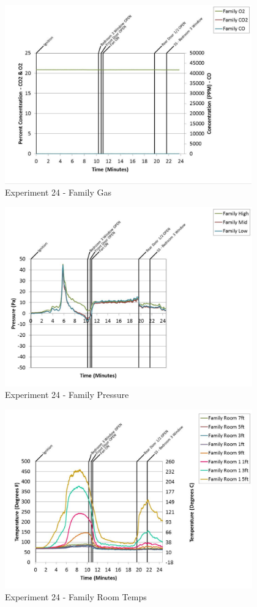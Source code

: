 \documentclass{article}
\begin{document}
\begin{appendices}
	\clearpage

	\begin{figure}[h!]
		\centering
		\includegraphics[height=3.05in]{0_Images/Results_Charts/Exp_24_Charts/FamilyGas.pdf}
		\caption{Experiment 24 - Family Gas}
	\end{figure}
 

	\begin{figure}[h!]
		\centering
		\includegraphics[height=3.05in]{0_Images/Results_Charts/Exp_24_Charts/FamilyPressure.pdf}
		\caption{Experiment 24 - Family Pressure}
	\end{figure}
 
	\clearpage

	\begin{figure}[h!]
		\centering
		\includegraphics[height=3.05in]{0_Images/Results_Charts/Exp_24_Charts/FamilyRoomTemps.pdf}
		\caption{Experiment 24 - Family Room Temps}
	\end{figure}
 


\end{appendices}
\end{document}
